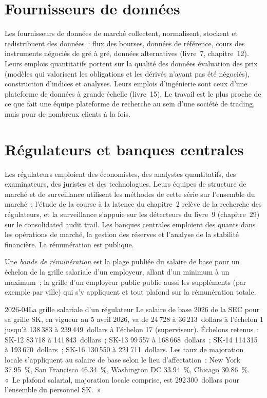 \section{Fournisseurs de données}

Les fournisseurs de données de marché collectent, normalisent, stockent et redistribuent des données~: flux des bourses, données de référence, cours des
instruments négociés de gré à gré, données alternatives (livre~7, chapitre~12). Leurs emplois quantitatifs portent sur la qualité des données
évaluation des prix (modèles qui valorisent les obligations et les dérivés n'ayant pas été négociés), construction d'indices et
analyses. Leurs emplois d'ingénierie sont ceux d'une plateforme de données à grande échelle (livre~15). Le travail est le plus proche de ce que fait une
équipe plateforme de recherche au sein d'une société de trading, mais pour de nombreux clients à la fois.

\section{Régulateurs et banques centrales}

Les régulateurs emploient des économistes, des analystes quantitatifs, des examinateurs, des juristes et des technologues. Leurs équipes de structure de marché et
de surveillance utilisent les méthodes de cette série sur l'ensemble du marché~: l'étude de la course à la latence du chapitre~2 relève de la
recherche des régulateurs, et la surveillance s'appuie sur les détecteurs du livre~9 (chapitre~29) sur le consolidated audit trail. Les banques centrales
emploient des quants dans les opérations de marché, la gestion des réserves et l'analyse de la stabilité financière. La rémunération est publique.

\begin{definition}\label{def:in:exchanges-brokers-vendors-and-regulators-as-employers:band}
Une \emph{bande de rémunération} est la plage publiée du salaire de base pour un échelon de la grille salariale d'un employeur, allant
d'un minimum à un maximum~; la grille d'un employeur public publie aussi les suppléments (par exemple par ville) qui s'y appliquent
et tout plafond sur la rémunération totale.
\end{definition}

\begin{dated}{2026-04}{La grille salariale d'un régulateur}\label{dat:in:exchanges-brokers-vendors-and-regulators-as-employers:sec}
Le salaire de base 2026 de la SEC pour sa grille SK, en vigueur au 5 avril 2026, va de 24\,728 à 36\,213~dollars à l'échelon 1 jusqu'à
138\,383 à 239\,449~dollars à l'échelon 17 (superviseur). Échelons retenus~: SK-12 83\,718 à 141\,843~dollars~; SK-13 99\,557 à 168\,668~dollars~;
SK-14 114\,315 à 193\,670~dollars~; SK-16 130\,550 à 221\,711~dollars. Les taux de majoration locale s'appliquent au salaire de base selon le lieu d'affectation~: New York
37.95~\%, San Francisco 46.34~\%, Washington DC 33.94~\%, Chicago 30.86~\%. «~Le plafond salarial, majoration locale comprise, est
292\,300~dollars pour l'ensemble du personnel SK.~»
\end{dated}

